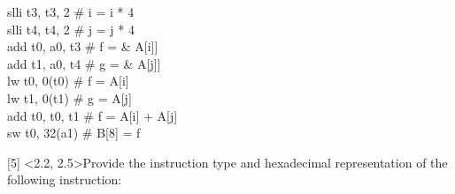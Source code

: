 \documentclass[12pt]{article}
\begin{document}
\begin{center}
			\begin{flushleft}
				\hspace{4cm} slli t3, t3, 2 \hspace{.7cm}  \# i = i * 4 \\
				\hspace{4cm} slli t4, t4, 2 \hspace{.7cm}  \# j = j * 4 \\
				\hspace{4cm} add t0, a0, t3 \hspace{.33cm}  \# f = \& A[i]] \\ 
				\hspace{4cm} add t1, a0, t4  \hspace{.34cm}  \# g = \& A[j]] \\ 
				\hspace{4cm} lw t0, 0(t0)  \hspace{.75cm}  \# f = A[i]\\
				\hspace{4cm} lw t1, 0(t1)  \hspace{.75cm}  \# g = A[j]\\
				\hspace{4cm} add t0, t0, t1  \hspace{.43cm}   \# f = A[i] + A[j]\\
				\hspace{4cm} sw t0, 32(a1)  \hspace{.45cm}   \# B[8] = f\\
			\end{flushleft}
			
		\end{center}
		
		
		
		
		
		
		\newpage
		
		
		
		
		
		
		\noindent {} 
		[5] \textless2.2, 2.5\textgreater Provide the instruction type and hexadecimal representation of the following instruction: \vspace{0.15cm} \\
		
\end{document}

